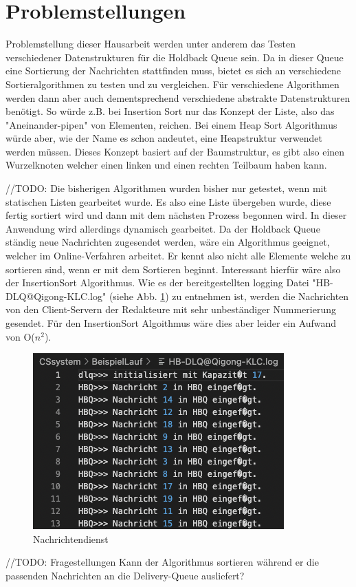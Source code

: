 \section{Problemstellungen} \label{Problemstellungen}

Problemstellung dieser Hausarbeit werden unter anderem das Testen verschiedener Datenstrukturen für die Holdback Queue sein. Da in dieser Queue eine Sortierung der Nachrichten stattfinden muss, bietet es sich an verschiedene Sortieralgorithmen zu testen und zu vergleichen. Für verschiedene Algorithmen werden dann aber auch dementsprechend verschiedene abstrakte Datenstrukturen benötigt. So würde z.B. bei Insertion Sort nur das Konzept der Liste, also das "Aneinander-pipen" von Elementen, reichen. Bei einem Heap Sort Algorithmus würde aber, wie der Name es schon andeutet, eine Heapstruktur verwendet werden müssen. Dieses Konzept basiert auf der Baumstruktur, es gibt also einen Wurzelknoten welcher einen linken und einen rechten Teilbaum haben kann. 

//TODO:
Die bisherigen Algorithmen wurden bisher nur getestet, wenn mit statischen Listen gearbeitet wurde. Es also eine Liste übergeben wurde, diese fertig sortiert wird und dann mit dem nächsten Prozess begonnen wird. In dieser Anwendung wird allerdings dynamisch gearbeitet. Da der Holdback Queue ständig neue Nachrichten zugesendet werden, wäre ein Algorithmus geeignet, welcher im Online-Verfahren arbeitet. Er kennt also nicht alle Elemente welche zu sortieren sind, wenn er mit dem Sortieren beginnt. Interessant hierfür wäre also der InsertionSort Algorithmus. 
Wie es der bereitgestellten logging Datei "HB-DLQ@Qigong-KLC.log" (siehe Abb. \ref{fig:HBQFilesEntry2}) zu entnehmen ist, werden die Nachrichten von den Client-Servern der Redakteure mit sehr unbeständiger Nummerierung gesendet. Für den InsertionSort Algoithmus wäre dies aber leider ein Aufwand von O($n^2$). 

\begin{figure}[htbp]
\begin{center}
\includegraphics[scale=0.6]{Bilder/HBQFilesEntry.png}
\caption{\label{fig:HBQFilesEntry2} Nachrichtendienst \cite{HBQlogging}} 
\end{center}
\end{figure}

//TODO: Fragestellungen
Kann der Algorithmus sortieren während er die passenden Nachrichten an die Delivery-Queue ausliefert?